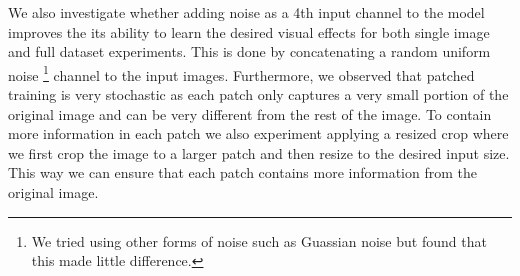 We also investigate whether adding noise as a 4th input channel to the model improves the its ability to learn the desired visual effects for both single image and full dataset experiments. This is done by concatenating a random uniform noise \footnote{We tried using other forms of noise such as Guassian noise but found that this made little difference.} channel to the input images.  Furthermore, we observed that patched training is very stochastic as each patch only captures a very small portion of the original image and can be very different from the rest of the image. To contain more information in each patch we also experiment applying a resized crop where we first crop the image to a larger patch and then resize to the desired input size. This way we can ensure that each patch contains more information from the original image.

